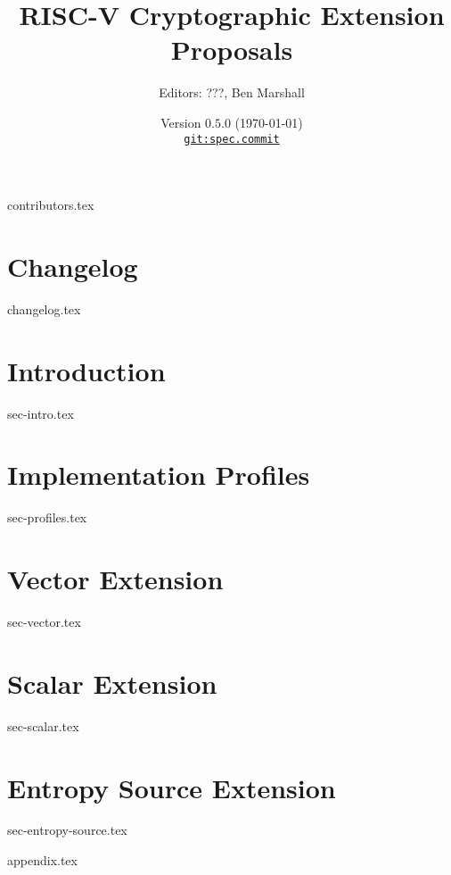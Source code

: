 \documentclass[11pt]{article}
\title{RISC-V Cryptographic Extension Proposals}
\author{Editors: ???, Ben Marshall}
\date{Version $0.5.0$ (\today) \\
\href{https://github.com/scarv/riscv-crypto}{
{\small \tt git:{spec.commit}}}
}
\begin{document}

\maketitle

{contributors.tex}

\tableofcontents


\newpage
\section{Changelog}
\label{sec:changelog}
{changelog.tex}


\newpage
\section{Introduction}
\label{sec:intro}
{sec-intro.tex}

\newpage
\section{Implementation Profiles}
\label{sec:profiles}
{sec-profiles.tex}

\newpage
\section{Vector Extension}
\label{sec:vector}
{sec-vector.tex}

\newpage
\section{Scalar Extension}
\label{sec:scalar}
{sec-scalar.tex}

\newpage
\section{Entropy Source Extension}
\label{sec:randombit}
{sec-entropy-source.tex}


\newpage
\printbibliography


%
%

\newpage
\begin{appendices}
\label{sec:appendix}
{appendix.tex}
\end{appendices}

\end{document}
